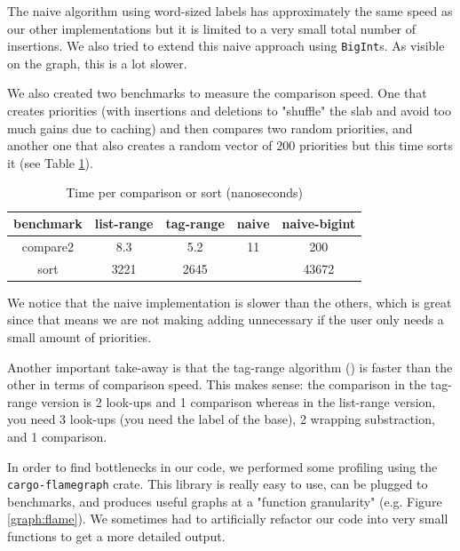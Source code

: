 \documentclass[12pt]{article}
\begin{document}
The naive algorithm using word-sized labels has approximately the same speed as our other implementations but it is limited to a very small total number of insertions. We also tried to extend this naive approach using \texttt{BigInt}s. As visible on the graph, this is a lot slower.

We also created two benchmarks to measure the comparison speed. One that creates priorities (with insertions and deletions to "shuffle" the slab and avoid too much gains due to caching) and then compares two random priorities, and another one that also creates a random vector of $200$ priorities but this time sorts it (see Table \ref{table:comparison}).

\begin{table}[h!]
  \begin{center}
    \begin{tabular}{|c | c c c c|}
      \hline
      benchmark & list-range & tag-range & naive & naive-bigint \\ [0.5ex]
      \hline
      compare2  & 8.3        & 5.2       & 11    & 200          \\
      \hline
      sort      & 3221       & 2645      &       & 43672        \\
      \hline
    \end{tabular}

    \caption{Time per comparison or sort (nanoseconds)}
    \label{table:comparison}

  \end{center}
\end{table}

We notice that the naive implementation is slower than the others, which is great since that means we are not making adding unnecessary if the user only needs a small amount of priorities.

Another important take-away is that the tag-range algorithm (\cite{10.5555/647912.740822}) is faster than the other in terms of comparison speed. This makes sense: the comparison in the tag-range version is 2 look-ups and 1 comparison whereas in the list-range version, you need 3 look-ups (you need the label of the base), 2 wrapping substraction, and 1 comparison.

In order to find bottlenecks in our code, we performed some profiling using the \texttt{cargo-flamegraph} crate. This library is really easy to use, can be plugged to benchmarks, and produces useful graphs at a "function granularity" (e.g. Figure \ref{graph:flame}). We sometimes had to artificially refactor our code into very small functions to get a more detailed output.
\end{document}
